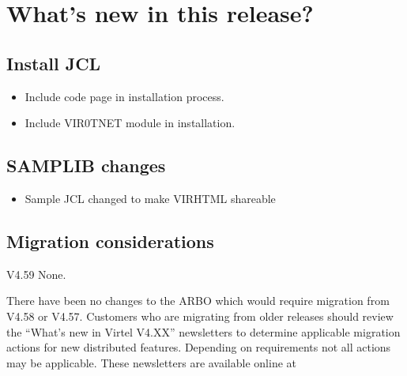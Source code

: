 \documentclass[letterpaper,10pt,english]{sphinxmanual}
\begin{document}
\section{What’s new in this release?}
\label{\detokenize{Getting_Started:what-s-new-in-this-release}}

\subsection{Install JCL}
\label{\detokenize{Getting_Started:install-jcl}}
\begin{itemize}
\item {} 
Include code page in installation process.

\end{itemize}

\begin{itemize}
\item {} 
Include VIR0TNET module in installation.

\end{itemize}


\subsection{SAMPLIB changes}
\label{\detokenize{Getting_Started:samplib-changes}}
\begin{itemize}
\item {} 
Sample JCL changed to make VIRHTML shareable

\end{itemize}


\subsection{Migration considerations}
\label{\detokenize{Getting_Started:migration-considerations}}
V4.59 None.

There have been no changes to the ARBO which would require migration from V4.58 or V4.57. Customers who are migrating from older releases should review the
“What’s new in Virtel V4.XX” newsletters to determine applicable migration actions for new distributed features.
Depending on requirements not all actions may be applicable. These newsletters are available online at 
\end{document}
